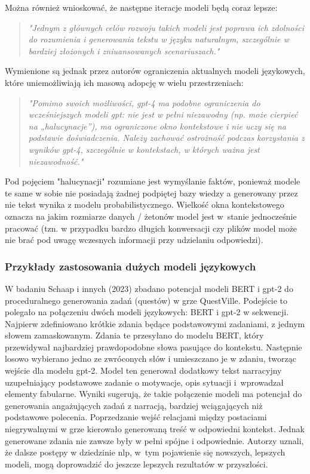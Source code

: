 Można również wnioskować, że następne iteracje modeli będą coraz lepsze:

\begin{quote}
    \textit{"Jednym z głównych celów rozwoju takich modeli jest poprawa ich zdolności do rozumienia i
        generowania tekstu w języku naturalnym, szczególnie w bardziej złożonych i zniuansowanych
        scenariuszach."}\cite{openai2024gpt4}
\end{quote}

Wymienione są jednak przez autorów ograniczenia aktualnych modeli językowych, które uniemożliwiają ich
masową adopcję w wielu przestrzeniach:

\begin{quote}
    \textit{"Pomimo swoich możliwości, \gls{gpt}-4 ma podobne ograniczenia do wcześniejszych modeli \gls{gpt}: nie jest w
        pełni niezawodny (np. może cierpieć na „halucynacje”), ma ograniczone okno kontekstowe i nie uczy
        się na podstawie doświadczenia. Należy zachować ostrożność podczas korzystania z wyników \gls{gpt}-4,
        szczególnie w kontekstach, w których ważna jest niezawodność."}\cite{openai2024gpt4}
\end{quote}

Pod pojęciem "halucynacji" rozumiane jest wymyślanie faktów, ponieważ modele te same w sobie nie posiadają
żadnej podpiętej bazy wiedzy a generowany przez nie tekst wynika z modelu probabilistycznego.
Wielkość okna kontekstowego oznacza na jakim rozmiarze
danych / żetonów model jest w~stanie jednocześnie pracować (tzn. w przypadku bardzo długich konwersacji
czy plików model może nie brać pod uwagę wczesnych informacji przy udzielaniu odpowiedzi).

\subsubsection*{Przykłady zastosowania dużych modeli językowych}

W badaniu Schaap i innych (2023)\cite{questville} zbadano potencjał modeli BERT i \gls{gpt}-2
do proceduralnego generowania zadań (questów) w grze QuestVille. Podejście
to polegało na połączeniu dwóch modeli językowych: BERT i \gls{gpt}-2 w sekwencji. Najpierw zdefiniowano krótkie
zdania będące podstawowymi zadaniami, z jednym słowem zamaskowanym. Zdania te przesyłano do modelu
BERT, który przewidywał najbardziej prawdopodobne słowa pasujące do kontekstu. Następnie losowo wybierano
jedno ze zwróconych słów i umieszczano je w zdaniu, tworząc wejście dla modelu \gls{gpt}-2. Model ten generował
dodatkowy tekst narracyjny uzupełniający podstawowe zadanie o motywacje, opis sytuacji i~wprowadzał
elementy fabularne. Wyniki sugerują, że takie połączenie modeli ma potencjał do generowania angażujących
zadań z narracją, bardziej wciągających niż podstawowe polecenia. Poprzedzanie wejść relacjami
między postaciami niegrywalnymi w grze kierowało generowaną treść w odpowiedni kontekst. Jednak
generowane zdania nie zawsze były w pełni spójne i odpowiednie. Autorzy uznali, że dalsze postępy w
dziedzinie \gls{nlp}, w~tym pojawienie się nowszych, lepszych modeli, mogą doprowadzić do jeszcze lepszych
rezultatów w przyszłości.\cite{questville}

